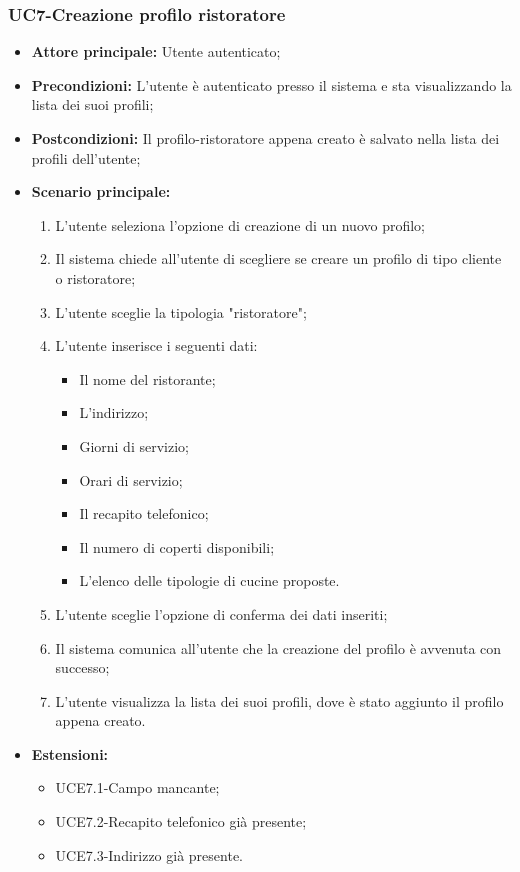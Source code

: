 \subsubsection{UC7-Creazione profilo ristoratore}
\begin{itemize}
    \item \textbf{Attore principale:} Utente autenticato;
    \item \textbf{Precondizioni:} L'utente è autenticato presso il sistema e sta visualizzando la lista dei suoi profili;
    \item \textbf{Postcondizioni:} Il profilo-ristoratore appena creato è salvato nella lista dei profili dell'utente;
    \item \textbf{Scenario principale:}
    \begin{enumerate}
        \item L'utente seleziona l'opzione di creazione di un nuovo profilo;
        \item Il sistema chiede all'utente di scegliere se creare un profilo di tipo cliente o ristoratore;
        \item L'utente sceglie la tipologia "ristoratore";
        \item L'utente inserisce i seguenti dati:
        \begin{itemize}
            \item Il nome del ristorante;
            \item L'indirizzo;
            \item Giorni di servizio;
            \item Orari di servizio;
            \item Il recapito telefonico;
            \item Il numero di coperti disponibili;
            \item L'elenco delle tipologie di cucine proposte.
        \end{itemize}
        \item L'utente sceglie l'opzione di conferma dei dati inseriti;
        \item Il sistema comunica all'utente che la creazione del profilo è avvenuta con successo;
        \item L'utente visualizza la lista dei suoi profili, dove è stato aggiunto il profilo appena creato.
    \end{enumerate}
        \item \textbf{Estensioni:}
        \begin{itemize}
                \item UCE7.1-Campo mancante;
                \item UCE7.2-Recapito telefonico già presente;
                \item UCE7.3-Indirizzo già presente.
        \end{itemize}
\end{itemize}

